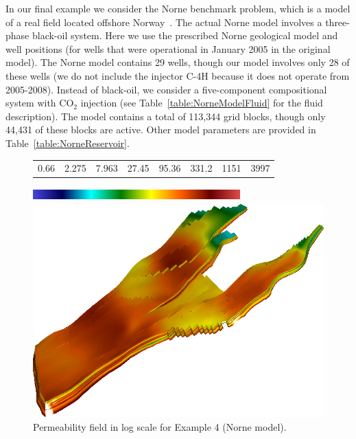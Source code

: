 \documentclass[twocolumn,numbook]{svjour3}          %
\begin{document}
In our final example we consider the Norne benchmark problem, which is a model
of a real field located offshore Norway~\cite{NorneWebsite}. The actual Norne
model involves a three-phase black-oil system. Here we use the prescribed Norne
geological model and well positions (for wells that were operational in January 2005 in the original model). The Norne model
contains 29 wells, though our
model involves only 28 of these wells (we do not include the injector C-4H
because it does not operate from 2005-2008). Instead of
black-oil, we consider a five-component compositional system with CO$_2$
injection (see Table~\ref{table:NorneModelFluid} for the fluid description). The
model contains a total of 113,344 grid blocks, though only 44,431 of these
blocks are active.  Other model parameters are provided in
Table~\ref{table:NorneReservoir}.


\begin{figure}[ht]
     \begin{center}
     \begin{tabular}{cccccccc}
      0.66 & 2.275 & 7.963 & 27.45 & 95.36 & 331.2 & 1151 & 3997
      \end{tabular}
       \includegraphics[width=8cm, height=0.5cm]{VanEssenModelPermeabilityMapColorBar.png}
       
       \medskip
      
       \includegraphics[totalheight=5cm]{NorneModelPermeabilityMap.png}
     \end{center}
     \caption{Permeability field in log scale for Example 4 (Norne model).}
  \label{fig:NorneModelAndWells}
\end{figure}
\end{document}
